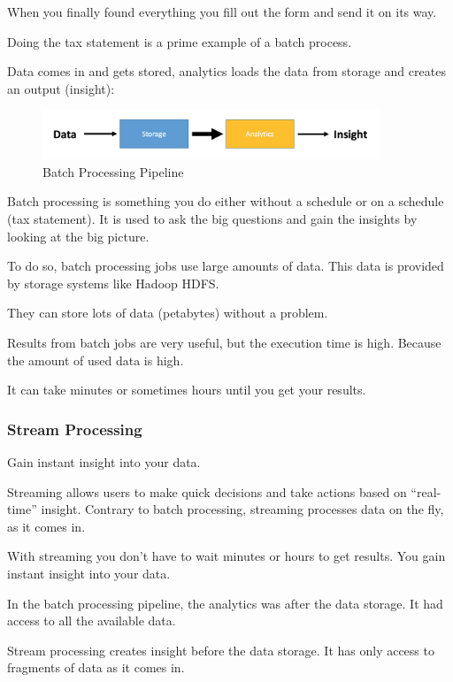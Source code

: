 \documentclass[12pt]{scrartcl} %
\begin{document}
When you finally found everything you fill out the form and send it on its way.

Doing the tax statement is a prime example of a batch process.

Data comes in and gets stored, analytics loads the data from storage and creates an output (insight):

\begin{figure}[htbp]
  \centering
     \includegraphics[width=0.9\textwidth]{images/Simple-Batch-Processing-Workflow}
  \caption{Batch Processing Pipeline}
  \label{fig:Bild1}
\end{figure}

Batch processing is something you do either without a schedule or on a schedule (tax statement). It is used to ask the big questions and gain the insights by looking at the big picture.

To do so, batch processing jobs use large amounts of data. This data is provided by storage systems like Hadoop HDFS.

They can store lots of data (petabytes) without a problem.

Results from batch jobs are very useful, but the execution time is high. Because the amount of used data is high.

It can take minutes or sometimes hours until you get your results.



\subsubsection{Stream Processing} Gain instant insight into your data.

Streaming allows users to make quick decisions and take actions based on “real-time” insight. Contrary to batch processing, streaming processes data on the fly, as it comes in.

With streaming you don’t have to wait minutes or hours to get results. You gain instant insight into your data.

In the batch processing pipeline, the analytics was after the data storage. It had access to all the available data.

Stream processing creates insight before the data storage. It has only access to fragments of data as it comes in.
\end{document}
